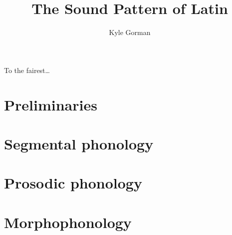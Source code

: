 \documentclass[draft,12pt]{book}
\title{The Sound Pattern of Latin}
\author{Kyle Gorman}
\date{}
\newenvironment{dedication}%
{\thispagestyle{empty}\cleardoublepage\thispagestyle{empty}\vspace*{\stretch{1}}\hfill\begin{minipage}[t]{0.66\textwidth}\raggedright}%
{\end{minipage}\vspace*{\stretch{3}}\clearpage\thispagestyle{empty}}
\begin{document}
\frontmatter
\maketitle
\begin{dedication}
To the fairest\ldots{}
\end{dedication}
\tableofcontents


\mainmatter
\part{Preliminaries}


\part{Segmental phonology}


\part{Prosodic phonology}



\part{Morphophonology}




\appendix



\backmatter


\end{document}

